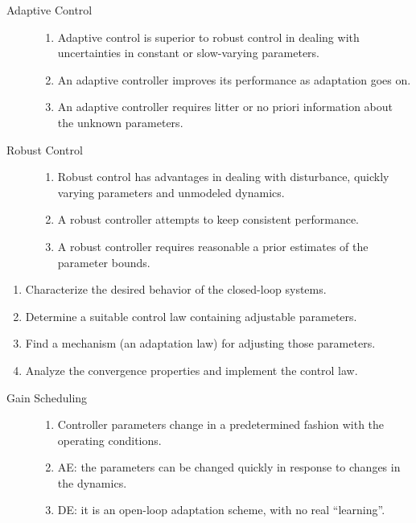   \begin{description}
    \item[Adaptive Control]
    \begin{enumerate}
      \item Adaptive control is superior to robust control in dealing with
      uncertainties in constant or slow-varying parameters.
      
      \item An adaptive controller improves its performance as adaptation goes
      on.
      
      \item An adaptive controller requires litter or no priori information
      about the unknown parameters.
    \end{enumerate}
  \end{description}
  
  \begin{description}
    \item[Robust Control]
    \begin{enumerate}
      \item Robust control has advantages in dealing with disturbance, quickly
      varying parameters and unmodeled dynamics.
      
      \item A robust controller attempts to keep consistent performance.
      
      \item A robust controller requires reasonable a prior estimates of the
      parameter bounds.
    \end{enumerate}
  \end{description}

\begin{enumerate}
    \item Characterize the desired behavior of the closed-loop systems.
    
    \item Determine a suitable control law containing adjustable parameters.
    
    \item Find a mechanism (an adaptation law) for adjusting those parameters.
    
    \item Analyze the convergence properties and implement the control law.
  \end{enumerate}
  \begin{description}
    \item[Gain Scheduling]
    \begin{enumerate}
      \item Controller parameters change in a predetermined fashion with the
      operating conditions.
      
      \item AE: the parameters can be changed quickly in response to changes in
      the dynamics.
      
      \item DE: it is an open-loop adaptation scheme, with no real ``learning''.
    \end{enumerate}
  \end{description}
  
